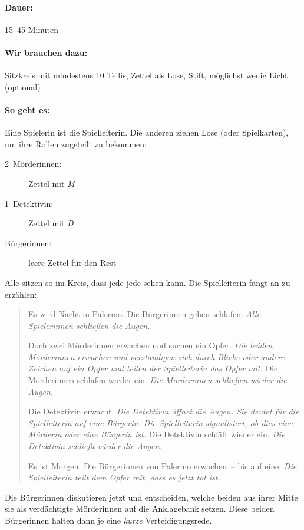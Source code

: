 \paragraph{Dauer:} 15--45 Minuten
\paragraph{Wir brauchen dazu:} Sitzkreis mit mindestens 10 Teilis, Zettel als Lose, Stift, möglichst wenig Licht (optional)
\paragraph{So geht es:} Eine Spielerin ist die Spielleiterin. Die anderen ziehen Lose (oder Spielkarten), um ihre Rollen zugeteilt zu bekommen:
\begin{description}
	\item [2~Mörderinnen:] Zettel mit \emph{M}
	\item [1~Detektivin:] Zettel mit \emph{D}
	\item [Bürgerinnen:] leere Zettel für den Rest
\end{description}

Alle sitzen so im Kreis, dass jede jede sehen kann. Die Spielleiterin fängt an zu erzählen:
\begin{quotation}
	Es wird Nacht in Palermo. Die Bürgerinnen gehen schlafen. \emph{Alle Spielerinnen schließen die Augen.}
	
	Doch zwei Mörderinnen erwachen und suchen ein Opfer. \emph{Die beiden Mörderinnen erwachen und verständigen sich durch Blicke oder andere Zeichen auf ein Opfer und teilen der Spielleiterin das Opfer mit.} Die Mörderinnen schlafen wieder ein. \emph{Die Mörderinnen schließen wieder die Augen.}
	
	Die Detektivin erwacht. \emph{Die Detektivin öffnet die Augen. Sie deutet für die Spielleiterin auf eine Bürgerin. Die Spielleiterin signalisiert, ob dies eine Mörderin oder eine Bürgerin ist.} Die Detektivin schläft wieder ein. \emph{Die Detektivin schließt wieder die Augen.}
	
	Es ist Morgen. Die Bürgerinnen von Palermo erwachen~-- bis auf eine. \emph{Die Spielleiterin teilt dem Opfer mit, dass es jetzt tot ist.}
\end{quotation}
	
Die Bürgerinnen diskutieren jetzt und entscheiden, welche beiden aus ihrer Mitte sie als verdächtigte Mörderinnen auf die Anklagebank setzen. Diese beiden Bürgerinnen halten dann je eine \emph{kurze} Verteidigungsrede.

